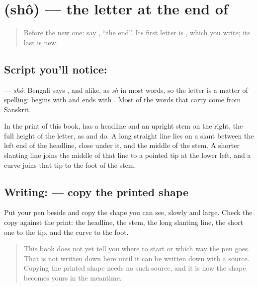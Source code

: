 \section[\texorpdfstring{\bn{ষ} (shô)}{ষ (shô)}]{ (shô) — the letter at the end of }

\label{lesson:BN-W265-letter-murdhanya-sha}



\begin{quote}
Before the new one: say \textbf{}, \textquotedblleft{}the end\textquotedblright{}. Its first letter is \textbf{}, which you write; its last is new.
\end{quote}

\subsection*{Script you'll notice: }
\textbf{} — \emph{shô}. Bengali says \textbf{}, \textbf{} and \textbf{} alike, as \emph{sh} in most words, so the letter is a matter of spelling: \textbf{} begins with \textbf{} and ends with \textbf{}. Most of the words that carry \textbf{} come from Sanskrit.

In the print of this book, \textbf{} has a headline and an upright stem on the right, the full height of the letter, as \textbf{} and \textbf{} do. A long straight line lies on a slant between the left end of the headline, close under it, and the middle of the stem. A shorter slanting line joins the middle of that line to a pointed tip at the lower left, and a curve joins that tip to the foot of the stem.

\subsection*{Writing:  — copy the printed shape}
Put your pen beside \textbf{} and copy the shape you can see, slowly and large. Check the copy against the print: the headline, the stem, the long slanting line, the short one to the tip, and the curve to the foot.

\begin{quote}
This book does not yet tell you where to start  or which way the pen goes. That is not written down here until it can be written down with a source. Copying the printed shape needs no such source, and it is how the shape becomes yours in the meantime.
\end{quote}

